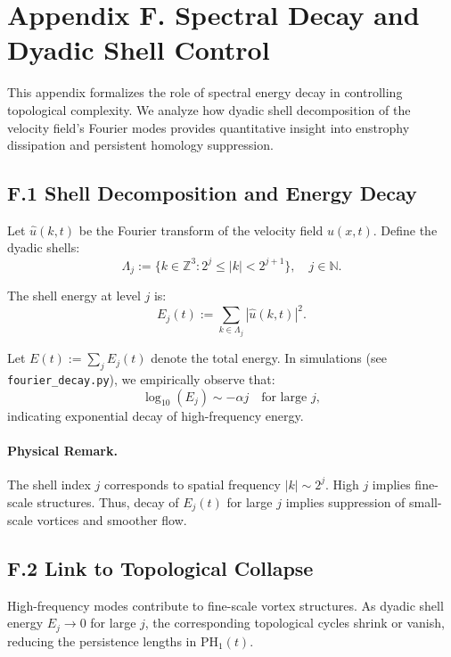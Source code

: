 \documentclass[11pt]{article}
\theoremstyle{definition}
\begin{document}

\section*{Appendix F. Spectral Decay and Dyadic Shell Control}

This appendix formalizes the role of spectral energy decay in controlling topological complexity. We
analyze how dyadic shell decomposition of the velocity field’s Fourier modes provides quantitative
insight into enstrophy dissipation and persistent homology suppression.

\subsection*{F.1 Shell Decomposition and Energy Decay}

Let \( \hat{u}(k, t) \) be the Fourier transform of the velocity field \( u(x, t) \). Define the dyadic shells:
\[ 
\Lambda_j := \{k \in \mathbb{Z}^3 : 2^j \leq |k| < 2^{j+1}\}, \quad j \in \mathbb{N}. 
\]

The shell energy at level \( j \) is:
\[ 
E_j(t) := \sum_{k \in \Lambda_j} |\hat{u}(k, t)|^2.
\]

Let \( E(t) := \sum_j E_j(t) \) denote the total energy. In simulations (see \texttt{fourier\_decay.py}), we
empirically observe that:
\[ 
\log_{10}(E_j) \sim -\alpha j \quad \text{for large } j, 
\]
indicating exponential decay of high-frequency energy.

\paragraph{Physical Remark.} The shell index \( j \) corresponds to spatial frequency \( |k| \sim 2^j \). High \( j \)
implies fine-scale structures. Thus, decay of \( E_j(t) \) for large \( j \) implies suppression of small-scale vortices
and smoother flow.

\subsection*{F.2 Link to Topological Collapse}

High-frequency modes contribute to fine-scale vortex structures. As dyadic shell energy \( E_j \to 0 \) for
large \( j \), the corresponding topological cycles shrink or vanish, reducing the persistence lengths in
\( \mathrm{PH}_1(t) \).
\end{document}
